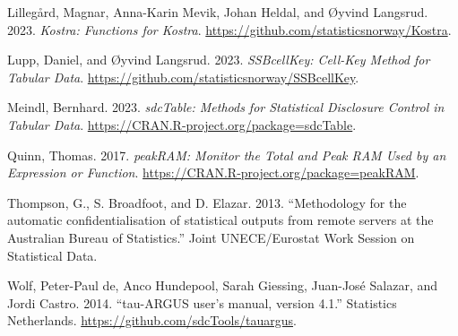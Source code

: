 \begin{CSLReferences}{1}{0}
\leavevmode{}%
Lillegård, Magnar, Anna-Karin Mevik, Johan Heldal, and Øyvind Langsrud. 2023. \emph{{Kostra}: Functions for Kostra}. \url{https://github.com/statisticsnorway/Kostra}.

\leavevmode{}%
Lupp, Daniel, and Øyvind Langsrud. 2023. \emph{{SSBcellKey}: Cell-Key Method for Tabular Data}. \url{https://github.com/statisticsnorway/SSBcellKey}.

\leavevmode{}%
Meindl, Bernhard. 2023. \emph{{sdcTable}: Methods for Statistical Disclosure Control in Tabular Data}. \url{https://CRAN.R-project.org/package=sdcTable}.

\leavevmode{}%
Quinn, Thomas. 2017. \emph{{peakRAM}: Monitor the Total and Peak RAM Used by an Expression or Function}. \url{https://CRAN.R-project.org/package=peakRAM}.

\leavevmode{}%
Thompson, G., S. Broadfoot, and D. Elazar. 2013. {``{Methodology for the automatic confidentialisation of statistical outputs from remote servers at the Australian Bureau of Statistics}.''} {Joint UNECE/Eurostat Work Session on Statistical Data}.

\leavevmode{}%
Wolf, Peter-Paul de, Anco Hundepool, Sarah Giessing, Juan-José Salazar, and Jordi Castro. 2014. {``{tau-ARGUS user's manual, version 4.1}.''} Statistics Netherlands. \url{https://github.com/sdcTools/tauargus}.

\end{CSLReferences}


\address{%
Øyvind Langsrud\\
Statistics Norway\\%
P.O. Box 8131 Dep.,\\ 0033 Oslo, Norway\\
%
\url{https://github.com/olangsrud}\\%
\textit{ORCiD: \href{https://orcid.org/0000-0002-1380-4396}{0000-0002-1380-4396}}\\%
\href{mailto:Oyvind.Langsrud@ssb.no}{\nolinkurl{Oyvind.Langsrud@ssb.no}}%
}
